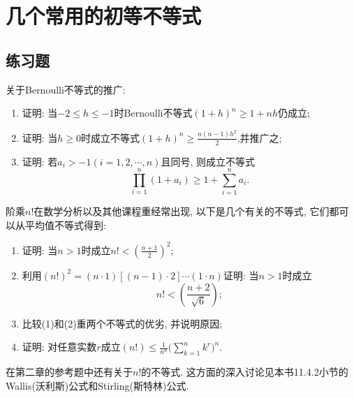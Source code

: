 \section{几个常用的初等不等式}
 \subsection{练习题}
     \begin{exercise}
         关于Bernoulli不等式的推广:
         \begin{enumerate}
             \item 证明: 当$-2 \leqslant h \leqslant -1$时Bernoulli不等式$(1+h)^n \geqslant 1+nh$仍成立;
             \item 证明: 当$h \geqslant 0$时成立不等式$(1+h)^n \geqslant \frac{n(n-1)h^2}{2}$,并推广之;
             \item 证明: 若$a_i>-1(i=1,2,\cdots,n)$且同号, 则成立不等式
                   \[
                       \prod_{i=1}^{n}(1+a_i)\geqslant 1+\sum_{i=1}^{n}a_i.
                   \]
         \end{enumerate}
     \end{exercise}
     \begin{solution}

     \end{solution}

     \begin{exercise}
         阶乘$n!$在数学分析以及其他课程重经常出现, 以下是几个有关的不等式, 它们都可以从平均值不等式得到:
         \begin{enumerate}
             \item 证明: 当$n>1$时成立$n!<\left(\frac{n+1}{2}\right)^2$;
             \item 利用$(n!)^2=(n\cdot 1)[(n-1)\cdot 2]\cdots(1\cdot n)$证明: 当$n>1$时成立
                   \[
                       n!<\left(\frac{n+2}{\sqrt{6}}\right);
                   \]
             \item 比较(1)和(2)重两个不等式的优劣, 并说明原因;
             \item 证明: 对任意实数$r$成立$(n!)\leqslant \frac{1}{n^n}\Big(\sum_{k=1}^{n}k^r\Big)^n$.
         \end{enumerate}
     \end{exercise}
     \begin{note}
         在第二章的参考题中还有关于$n!$的不等式. 这方面的深入讨论见本书11.4.2小节的Wallis(沃利斯)公式和Stirling(斯特林)公式.
     \end{note}
     \begin{solution}

     \end{solution}

